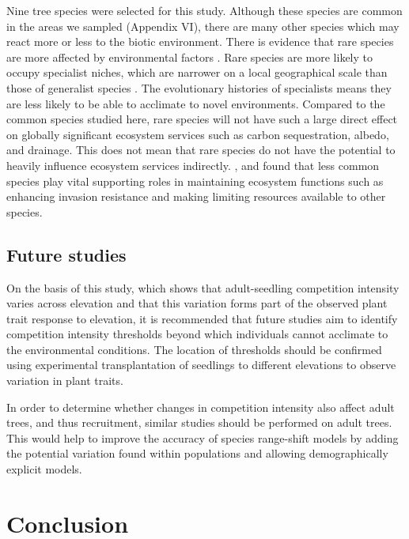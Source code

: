 \documentclass[a4paper, 11pt]{article}
\begin{document}
Nine tree species were selected for this study. Although these species are common in the areas we sampled (Appendix VI), there are many other species which may react more or less to the biotic environment. There is evidence that rare species are more affected by environmental factors \citep{Lyons2005,Mouillot2013}. Rare species are more likely to occupy specialist niches, which are narrower on a local geographical scale than those of generalist species \citep{Boulangeat2012}. The evolutionary histories of specialists means they are less likely to be able to acclimate to novel environments. Compared to the common species studied here, rare species will not have such a large direct effect on globally significant ecosystem services such as carbon sequestration, albedo, and drainage. This does not mean that rare species do not have the potential to heavily influence ecosystem services indirectly. \citet{Lyons2001}, and \citet{Lyons2005} found that less common species play vital supporting roles in maintaining ecosystem functions such as enhancing invasion resistance and making limiting resources available to other species. 

\subsection{Future studies}

On the basis of this study, which shows that adult-seedling competition intensity varies across elevation and that this variation forms part of the observed plant trait response to elevation, it is recommended that future studies aim to identify competition intensity thresholds beyond which individuals cannot acclimate to the environmental conditions. The location of thresholds should be confirmed using experimental transplantation of seedlings to different elevations to observe variation in plant traits.

In order to determine whether changes in competition intensity also affect adult trees, and thus recruitment, similar studies should be performed on adult trees. This would help to improve the accuracy of species range-shift models by adding the potential variation found within populations and allowing demographically explicit models.
\section*{Conclusion}



\end{document}
